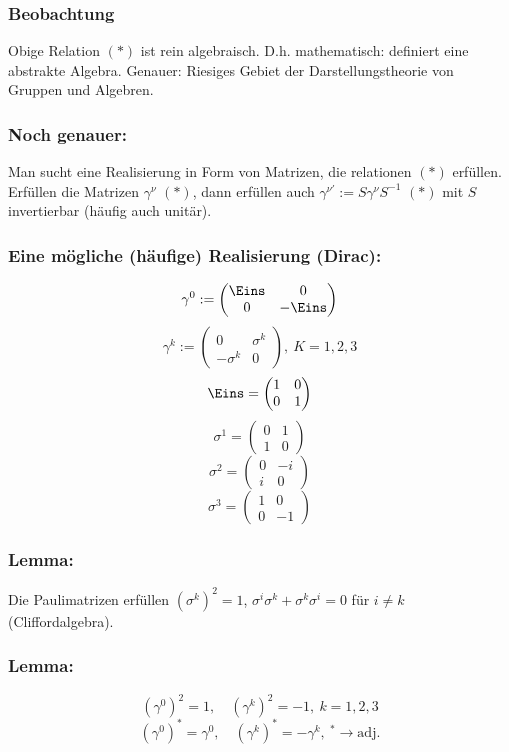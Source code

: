 \documentclass[twoside,a4paper]{scrartcl}
\renewcommand{\1}{\mathds{1}}
\newcommand{\ra}{\rightarrow}
\begin{document}
\subsubsection*{Beobachtung}
Obige Relation $(*)$ ist rein algebraisch. D.h. mathematisch: definiert eine abstrakte Algebra. Genauer: Riesiges Gebiet der Darstellungstheorie von Gruppen und Algebren.
\subsubsection*{Noch genauer:}
Man sucht eine Realisierung in Form von Matrizen, die relationen $(*)$ erfüllen.\\
Erfüllen die Matrizen $\gamma^\nu$ $(*)$, dann erfüllen auch $\gamma^{\nu'}:=S\gamma^\nu S^{-1}$ $(*)$ mit $S$ invertierbar (häufig auch unitär).
\subsubsection*{Eine mögliche (häufige) Realisierung (Dirac):}
$$\gamma^0:=\begin{pmatrix} \Eins & 0 \\ 0 & -\Eins \end{pmatrix}$$
$$\gamma^k:=\begin{pmatrix} 0 & \sigma^k \\ -\sigma^k & 0 \end{pmatrix}, \ K=1,2,3$$
$$\Eins=\begin{pmatrix} 1 & 0 \\ 0 & 1 \end{pmatrix}$$
$$\sigma^1=\begin{pmatrix} 0 & 1 \\ 1 & 0 \end{pmatrix}$$
$$\sigma^2=\begin{pmatrix} 0 & -i \\ i & 0 \end{pmatrix}$$
$$\sigma^3=\begin{pmatrix} 1 & 0 \\ 0 & -1 \end{pmatrix}$$
\subsubsection*{Lemma:}
Die Paulimatrizen erfüllen $(\sigma^k)^2=1$, $\sigma^i\sigma^k+\sigma^k\sigma^i=0$ für $i\neq k$ (Cliffordalgebra).
\subsubsection*{Lemma:}
$$(\gamma^0)^2=1, \quad (\gamma^k)^2=-1, \ k=1,2,3$$
$$(\gamma^0)^*=\gamma^0, \quad (\gamma^k)^*=-\gamma^k, \ ^*\ra \mathrm{adj.}$$
\end{document}
